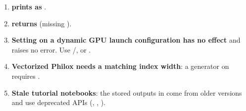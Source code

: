 \begin{enumerate}
        \texttt{f[0,0]}~$\leftarrow$~\texttt{f[1,0]} is accepted (\cref{sec:constraints}).
  \item \textbf{ prints as }.
  \item \textbf{ returns
        } (missing ).
  \item \textbf{Setting  on a dynamic GPU launch configuration has no
        effect} and raises no error. Use /, or
        .
  \item \textbf{Vectorized Philox needs a matching index width}: a 
        generator on  requires .
  \item \textbf{Stale tutorial notebooks}: the stored outputs in
         come from older versions and use
        deprecated APIs (, ,
        ).
\end{enumerate}

